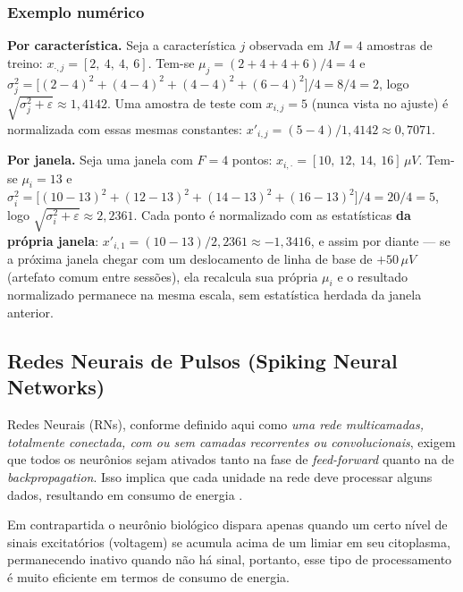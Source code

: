 			\subsubsection{Exemplo numérico}

				\par \textbf{Por característica.} Seja a característica $j$ observada em $M=4$ amostras de treino: $x_{\cdot,j} = [2,\ 4,\ 4,\ 6]$. Tem-se $\mu_j = (2+4+4+6)/4 = 4$ e $\sigma_j^2 = \big[(2-4)^2+(4-4)^2+(4-4)^2+(6-4)^2\big]/4 = 8/4 = 2$, logo $\sqrt{\sigma_j^2+\varepsilon}\approx 1{,}4142$. Uma amostra de teste com $x_{i,j}=5$ (nunca vista no ajuste) é normalizada com essas mesmas constantes: $x'_{i,j} = (5-4)/1{,}4142 \approx 0{,}7071$.

				\par \textbf{Por janela.} Seja uma janela com $F=4$ pontos: $x_{i,\cdot} = [10,\ 12,\ 14,\ 16]\,\mu V$. Tem-se $\mu_i = 13$ e $\sigma_i^2 = \big[(10-13)^2+(12-13)^2+(14-13)^2+(16-13)^2\big]/4 = 20/4 = 5$, logo $\sqrt{\sigma_i^2+\varepsilon}\approx 2{,}2361$. Cada ponto é normalizado com as estatísticas \textbf{da própria janela}: $x'_{i,1} = (10-13)/2{,}2361 \approx -1{,}3416$, e assim por diante --- se a próxima janela chegar com um deslocamento de linha de base de $+50\,\mu V$ (artefato comum entre sessões), ela recalcula sua própria $\mu_i$ e o resultado normalizado permanece na mesma escala, sem estatística herdada da janela anterior.

		\subsection{Redes Neurais de Pulsos (Spiking Neural Networks)}

			\par Redes Neurais (RNs), conforme definido aqui como \textit{uma rede multicamadas, totalmente conectada, com ou sem camadas recorrentes ou convolucionais}, exigem que todos os neurônios sejam ativados tanto na fase de \textit{feed-forward} quanto na de \textit{backpropagation}. Isso implica que cada unidade na rede deve processar alguns dados, resultando em consumo de energia \cite{10242251}.
			
			\par Em contrapartida o neurônio biológico dispara apenas quando um certo nível de sinais excitatórios (voltagem) se acumula acima de um limiar em seu citoplasma, permanecendo inativo quando não há sinal, portanto, esse tipo de processamento é muito eficiente em termos de consumo de energia.


